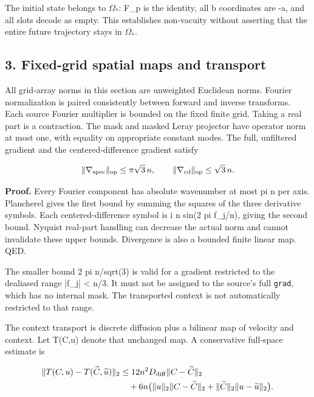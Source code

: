 \documentclass[11pt,a4paper]{article}
\begin{document}
The initial state belongs to \(\Omega_*\): F\_p is the identity, all b coordinates are -a, and all slots decode as empty. This establishes non-vacuity without asserting that the entire future trajectory stays in \(\Omega_*\).

\subsection*{3. Fixed-grid spatial maps and transport}

All grid-array norms in this section are unweighted Euclidean norms. Fourier normalization is paired consistently between forward and inverse transforms. Each source Fourier multiplier is bounded on the fixed finite grid. Taking a real part is a contraction. The mask and masked Leray projector have operator norm at most one, with equality on appropriate constant modes. The full, unfiltered gradient and the centered-difference gradient satisfy



\[
\|\nabla_{\rm spec}\|_{\rm op}\le\pi\sqrt3\,n,
\qquad
\|\nabla_{\rm cd}\|_{\rm op}\le\sqrt3\,n.
\]



\textbf{Proof.} Every Fourier component has absolute wavenumber at most pi n per axis. Plancherel gives the first bound by summing the squares of the three derivative symbols. Each centered-difference symbol is i n sin(2 pi f\_j/n), giving the second bound. Nyquist real-part handling can decrease the actual norm and cannot invalidate these upper bounds. Divergence is also a bounded finite linear map. QED.

The smaller bound 2 pi n/sqrt(3) is valid for a gradient restricted to the dealiased range |f\_j| < n/3. It must not be assigned to the source's full \texttt{grad}, which has no internal mask. The transported context is not automatically restricted to that range.

The context transport is discrete diffusion plus a bilinear map of velocity and context. Let T(C,u) denote that unchanged map. A conservative full-space estimate is



\[
\begin{aligned}
\|T(C,u)-T(\widetilde C,\widetilde u)\|_2
&\le12n^2D_{\rm diff}\|C-\widetilde C\|_2\\
&\quad+6n\bigl(\|u\|_2\|C-\widetilde C\|_2
+\|\widetilde C\|_2\|u-\widetilde u\|_2\bigr).
\end{aligned}
\]
\end{document}
